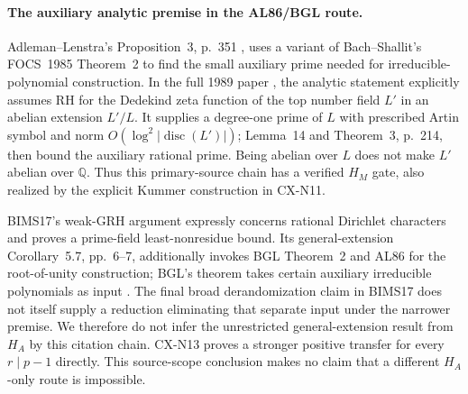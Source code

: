 \paragraph{The auxiliary analytic premise in the AL86/BGL route.}
Adleman--Lenstra's Proposition~3, p.~351 \cite{CXNAdlemanLenstra86},
uses a variant of Bach--Shallit's FOCS~1985 Theorem~2 to find the
small auxiliary prime needed for irreducible-polynomial construction.
In the full 1989 paper \cite[\S8, Lemma~13, pp.~213--214]{CXBachShallit89},
the analytic statement explicitly assumes RH for the Dedekind zeta
function of the top number field $L'$ in an abelian extension
$L'/L$. It supplies a degree-one prime of $L$ with prescribed Artin
symbol and norm $O(\log^2|\operatorname{disc}(L')|)$; Lemma~14 and
Theorem~3, p.~214, then bound the auxiliary rational prime.
Being abelian over $L$ does not make $L'$ abelian over $\mathbb Q$.
Thus this primary-source chain has a verified $H_M$ gate, also
realized by the explicit Kummer construction in CX-N11.

BIMS17's \cite[Conjecture~6.3 and Theorem~6.7, pp.~7--8]{BIMS17}
weak-GRH argument expressly concerns rational Dirichlet characters
and proves a prime-field least-nonresidue bound. Its general-extension
Corollary~5.7, pp.~6--7, additionally invokes BGL Theorem~2 and AL86
for the root-of-unity construction; BGL's theorem takes certain
auxiliary irreducible polynomials as input
\cite[Theorem~2, p.~7]{CXNBGL01}.
The final broad derandomization claim in BIMS17 does not itself
supply a reduction eliminating that separate input under the narrower
premise. We therefore do not infer the unrestricted general-extension
result from $H_A$ by this citation chain. CX-N13 proves a stronger
positive transfer for every $r\mid p-1$ directly. This source-scope
conclusion makes no claim that a different $H_A$-only route is
impossible.
